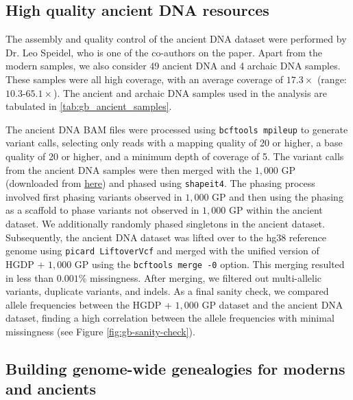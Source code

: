 \subsection{High quality ancient DNA resources}

The assembly and quality control of the ancient DNA dataset were performed by Dr. Leo Speidel, who is one of the co-authors on the paper.
%
Apart from the modern samples, we also consider 49 ancient DNA and 4 archaic DNA samples. These samples were all high coverage, with an average coverage of $17.3\times$ (range: $10.3$-$65.1 \times$). The ancient and archaic DNA samples used in the analysis are tabulated in \ref{tab:gb_ancient_samples}.

The ancient DNA BAM files were processed using \texttt{bcftools mpileup} to generate variant calls, selecting only reads with a mapping quality of 20 or higher, a base quality of 20 or higher, and a minimum depth of coverage of 5.
%
The variant calls from the ancient DNA samples were then merged with the $1{,}000$ GP (downloaded from \href{https://ftp.1000genomes.ebi.ac.uk/vol1/ftp/release/20130502/}{here}) and phased using \texttt{shapeit4}. The phasing process involved first phasing variants observed in $1{,}000$ GP and then using the phasing as a scaffold to phase variants not observed in $1{,}000$ GP within the ancient dataset. We additionally randomly phased singletons in the ancient dataset.
%
Subsequently, the ancient DNA dataset was lifted over to the hg38 reference genome using \texttt{picard LiftoverVcf} and merged with the unified version of HGDP + $1{,}000$ GP using the \texttt{bcftools merge -0} option. This merging resulted in less than $0.001$\% missingness. After merging, we filtered out multi-allelic variants, duplicate variants, and indels. As a final sanity check, we compared allele frequencies between the HGDP + $1{,}000$ GP dataset and the ancient DNA dataset, finding a high correlation between the allele frequencies with minimal missingness (see Figure \ref{fig:gb-sanity-check}).

\subsection{Building genome-wide genealogies for moderns and ancients}

